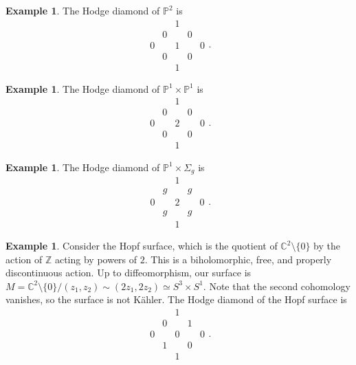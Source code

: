 \documentclass[leqno, openany]{memoir}
\theoremstyle{definition}
\newtheorem{exm}[thm]{Example}
\theoremstyle{remark}
\theoremstyle{plain}
\theoremstyle{definition}
\theoremstyle{remark}
\newcommand{\C}{\mathbb{C}}
\newcommand{\Z}{\mathbb{Z}}
\renewcommand{\P}{\mathbb{P}}
\begin{document}
\begin{exm}
    The Hodge diamond of $\P^2$ is 
    \[ \begin{array}{ccccc}
         & & 1 & & \\
         & 0 & & 0 & \\
        0 & & 1 & & 0 \\
          & 0 & & 0 & \\
          & & 1 & & 
    \end{array}.\]
\end{exm}

\begin{exm}
    The Hodge diamond of $\P^1 \times \P^1$ is 
    \[ \begin{array}{ccccc}
         & & 1 & & \\
         & 0 & & 0 & \\
        0 & & 2 & & 0 \\
          & 0 & & 0 & \\
          & & 1 & & 
    \end{array}.\]
\end{exm}

\begin{exm}
    The Hodge diamond of $\P^1 \times \Sigma_g$ is
    \[ \begin{array}{ccccc}
         & & 1 & & \\
         & g & & g & \\
        0 & & 2 & & 0 \\
          & g & & g & \\
          & & 1 & & 
    \end{array}.\]
\end{exm}

\begin{exm}
    Consider the Hopf surface, which is the quotient of $\C^2 \setminus \{0\}$ by the action of $\Z$ acting by powers of $2$. This is a biholomorphic, free, and properly discontinuous action. Up to diffeomorphism, our surface is $M = \C^2 \setminus \{0\} / (z_1,z_2) \sim (2z_1, 2z_2) \simeq S^3 \times S^1$. Note that the second cohomology vanishes, so the surface is not K\"ahler. The Hodge diamond of the Hopf surface is
    \[ \begin{array}{ccccc}
         & & 1 & & \\
         & 0 & & 1 & \\
        0 & & 0 & & 0 \\
          & 1 & & 0 & \\
          & & 1 & & 
    \end{array}.\]
\end{exm}
\end{document}

